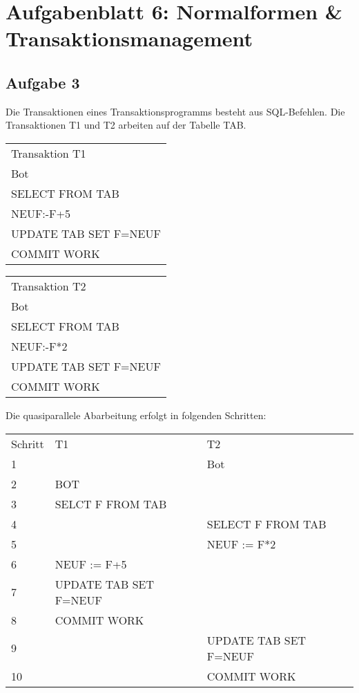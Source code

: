 \documentclass{lehramt-informatik-haupt}
\begin{document}
\chapter{Aufgabenblatt 6: Normalformen \& Transaktionsmanagement}

%

\section{Aufgabe 3}

Die Transaktionen eines Transaktionsprogramms besteht aus SQL-Befehlen.
Die Transaktionen T1 und T2 arbeiten auf der Tabelle TAB.

\begin{tabular}{l}
Transaktion T1        \\
Bot                   \\
SELECT FROM TAB       \\
NEUF:-F+5             \\
UPDATE TAB SET F=NEUF \\
COMMIT WORK
\end{tabular}

\begin{tabular}{l}
Transaktion T2        \\
Bot                   \\
SELECT FROM TAB       \\
NEUF:-F*2             \\
UPDATE TAB SET F=NEUF \\
COMMIT WORK
\end{tabular}

Die quasiparallele Abarbeitung erfolgt in folgenden Schritten:

\begin{tabular}{lll}
Schritt & T1                    & T2                    \\
1       &                       & Bot                   \\
2       & BOT                   &                       \\
3       & SELCT F FROM TAB      &                       \\
4       &                       & SELECT F FROM TAB     \\
5       &                       & NEUF := F*2           \\
6       & NEUF := F+5           &                       \\
7       & UPDATE TAB SET F=NEUF &                       \\
8       & COMMIT WORK           &                       \\
9       &                       & UPDATE TAB SET F=NEUF \\
10      &                       & COMMIT WORK
\end{tabular}
\end{document}
